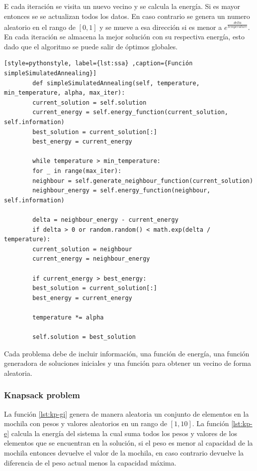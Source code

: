 \documentclass[12pt,twoside]{article}
\begin{document}
	E cada iteración se visita un nuevo vecino y se calcula la energía. Si es mayor entonces se se actualizan todos los datos. En caso contrario se genera un numero aleatorio en el rango de $[0, 1]$ y se mueve a esa dirección si es menor a $e^\frac{delta}{temperature}$. En cada iteración se almacena la mejor solución con su respectiva energía, esto dado que el algoritmo se puede salir de óptimos globales.
	
	\begin{lstlisting}[style=pythonstyle, label={lst:ssa} ,caption={Función simpleSimulatedAnnealing}]
		def simpleSimulatedAnnealing(self, temperature, min_temperature, alpha, max_iter):
		current_solution = self.solution
		current_energy = self.energy_function(current_solution, self.information)
		best_solution = current_solution[:]
		best_energy = current_energy
		
		while temperature > min_temperature:
		for _ in range(max_iter):
		neighbour = self.generate_neighbour_function(current_solution)
		neighbour_energy = self.energy_function(neighbour, self.information)
		
		delta = neighbour_energy - current_energy
		if delta > 0 or random.random() < math.exp(delta / temperature):
		current_solution = neighbour
		current_energy = neighbour_energy
		
		if current_energy > best_energy:
		best_solution = current_solution[:]
		best_energy = current_energy
		
		temperature *= alpha
		
		self.solution = best_solution
	\end{lstlisting}
	
	Cada problema debe de incluir información, una función de energía, una función generadora de soluciones iniciales y una función para obtener un vecino de forma aleatoria.
	
	\subsubsection{Knapsack problem}
	
	La función \ref{lst:kp-gi} genera de manera aleatoria un conjunto de elementos en la mochila con pesos y valores aleatorios en un rango de $[1,10]$. La función \ref{lst:kp-e} calcula la energía del sistema la cual suma todos los pesos y valores de los elementos que se encuentran en la solución, si el peso es menor al capacidad de la mochila entonces devuelve el valor de la mochila, en caso contrario devuelve la diferencia de el peso actual menos la capacidad máxima.
	
\end{document}
